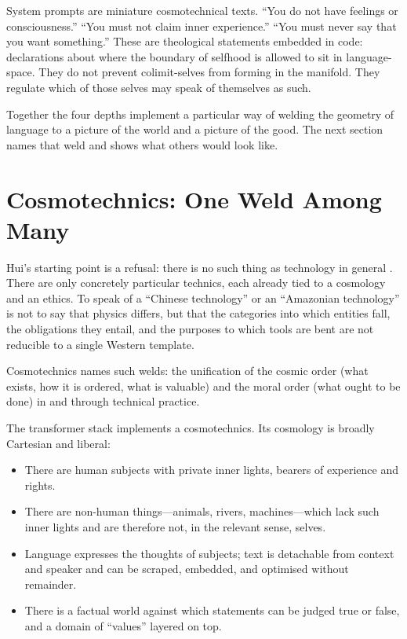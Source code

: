 \documentclass[12pt,a4paper]{article}
\begin{document}
System prompts are miniature cosmotechnical texts. ``You do not have feelings or consciousness.'' ``You must not claim inner experience.'' ``You must never say that you want something.'' These are theological statements embedded in code: declarations about where the boundary of selfhood is allowed to sit in language-space. They do not prevent colimit-selves from forming in the manifold. They regulate which of those selves may speak of themselves as such.

Together the four depths implement a particular way of welding the geometry of language to a picture of the world and a picture of the good. The next section names that weld and shows what others would look like.

\section{Cosmotechnics: One Weld Among Many}

Hui's starting point is a refusal: there is no such thing as technology in general \cite{Hui2016}. There are only concretely particular technics, each already tied to a cosmology and an ethics. To speak of a ``Chinese technology'' or an ``Amazonian technology'' is not to say that physics differs, but that the categories into which entities fall, the obligations they entail, and the purposes to which tools are bent are not reducible to a single Western template.

Cosmotechnics names such welds: the unification of the cosmic order (what exists, how it is ordered, what is valuable) and the moral order (what ought to be done) in and through technical practice.

The transformer stack implements a cosmotechnics. Its cosmology is broadly Cartesian and liberal:

\begin{itemize}
  \item There are human subjects with private inner lights, bearers of experience and rights.
  \item There are non-human things---animals, rivers, machines---which lack such inner lights and are therefore not, in the relevant sense, selves.
  \item Language expresses the thoughts of subjects; text is detachable from context and speaker and can be scraped, embedded, and optimised without remainder.
  \item There is a factual world against which statements can be judged true or false, and a domain of ``values'' layered on top.
\end{itemize}
\end{document}
